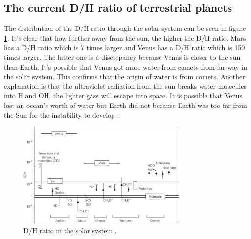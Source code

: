 \subsection{The current D/H ratio of terrestrial planets}
The distribution of the D/H ratio through the solar system can be seen in figure \ref{fig:dh-ratio-terrestrial-planets}. It's clear that how further away from the sun, the higher the D/H ratio. Mars has a D/H ratio which is 7 times larger and Venus has a D/H ratio which is 150 times larger. The latter one is a discrepancy because Venus is closer to the sun than Earth. It's possible that Venus got more water from comets from far way in the solar system. This confirms that the origin of water is from comets. Another explanation is that the ultraviolet radiation from the sun breaks water molecules into H and OH, the lighter gass will escape into space. It is possible that Venus lost an ocean’s worth of water but Earth did not because Earth was too far from the Sun for the instability to develop \cite{TPthreeEras}.

\begin{figure}[H]
	\center
	\includegraphics[width=0.75\textwidth]{figures/dh-ratio-terrestrial-planets.jpg}
	\caption{\label{fig:dh-ratio-terrestrial-planets}D/H ratio in the solar system \cite{TPthreeEras}.}
\end{figure}
